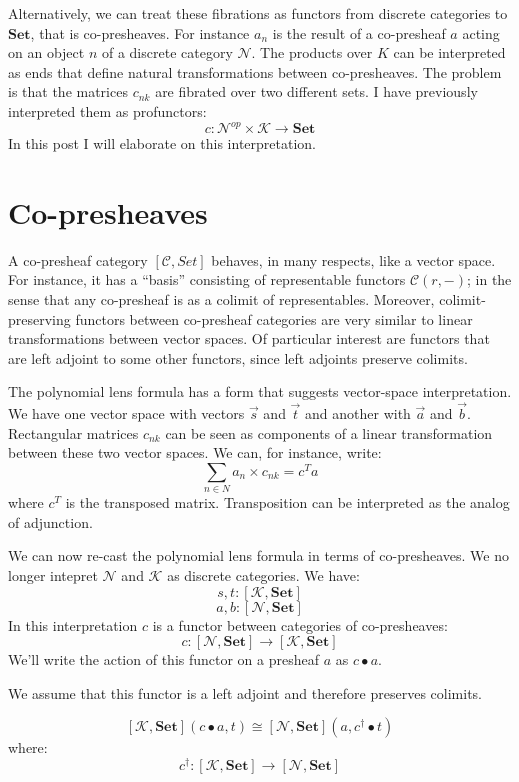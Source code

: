 \documentclass[11pt]{amsart}
\newcommand{\cat}[1]{\mathcal{#1}}%
\newcommand{\Cat}[1]{\mathbf{#1}}%
\newcommand{\Set}{\Cat{Set}}
\begin{document}
Alternatively, we can treat these fibrations as functors from discrete categories to $\Set$, that is co-presheaves. For instance $a_n$ is the result of a co-presheaf $a$ acting on an object $n$ of a discrete category $\cat N$. The products over $K$ can be interpreted as ends that define natural transformations between co-presheaves. The problem is that the matrices $c_{n k}$ are fibrated over two different sets. I have previously interpreted them as profunctors:
\[ c \colon \cat N^{op} \times \cat K \to \Set \]
In this post I will elaborate on this interpretation.

\section{Co-presheaves}

A co-presheaf category  $[\cat C, Set ]$ behaves, in many respects, like a vector space. For instance, it has a ``basis'' consisting of representable functors $\cat C (r, -)$; in the sense that any co-presheaf is as a colimit of representables. Moreover, colimit-preserving functors between co-presheaf categories are very similar to linear transformations between vector spaces. Of particular interest are functors that are left adjoint to some other functors, since left adjoints preserve colimits. 

The polynomial lens formula has a form that suggests vector-space interpretation. We have one vector space with vectors $\vec{s}$ and $\vec{t}$ and another with $\vec{a}$ and $\vec{b}$. Rectangular matrices $c_{n k}$ can be seen as components of a linear transformation between these two vector spaces. We can, for instance, write:
\[  \sum_{n \in N} a_n \times c_{n k} = c^T a \]
where $c^T$ is the transposed matrix. Transposition can be interpreted as the analog of adjunction. 

We can now re-cast the polynomial lens formula in terms of co-presheaves. We no longer intepret $\cat N$ and $\cat K$ as discrete categories. We have:
\[ s, t \colon [\cat K, \Set] \]
\[a, b \colon [\cat N, \Set] \]
In this interpretation $c$ is a functor between categories of co-presheaves:
\[ c \colon [\cat N, \Set] \to [\cat K, \Set] \]
We'll write the action of this functor on a presheaf $a$ as $c \bullet a$.

We assume that this functor is a left adjoint and therefore preserves colimits. 

\[ [\cat K, \Set] (c \bullet a, t) \cong [\cat N, \Set] (a, c^{\dagger} \bullet t) \]
where:
\[ c^{\dagger} \colon [\cat K, \Set] \to [\cat N, \Set] \]
\end{document}
